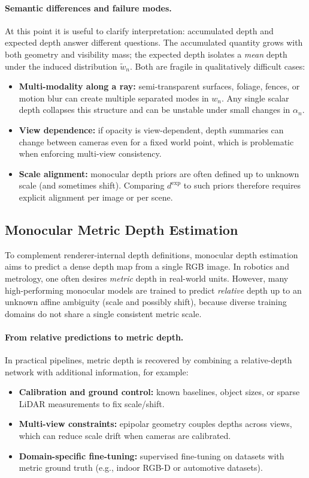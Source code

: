\documentclass{report}
\begin{document}
\paragraph{Semantic differences and failure modes.}
At this point it is useful to clarify interpretation: accumulated depth and expected depth answer different questions. The accumulated quantity grows with both geometry and visibility mass; the expected depth isolates a \emph{mean} depth under the induced distribution $\tilde{w}_n$. Both are fragile in qualitatively difficult cases:
\begin{itemize}
    \item \textbf{Multi-modality along a ray:} semi-transparent surfaces, foliage, fences, or motion blur can create multiple separated modes in $w_n$. Any single scalar depth collapses this structure and can be unstable under small changes in $\alpha_n$.
    \item \textbf{View dependence:} if opacity is view-dependent, depth summaries can change between cameras even for a fixed world point, which is problematic when enforcing multi-view consistency.
    \item \textbf{Scale alignment:} monocular depth priors are often defined up to unknown scale (and sometimes shift). Comparing $d^{\mathrm{exp}}$ to such priors therefore requires explicit alignment per image or per scene.
\end{itemize}

\subsection{Monocular Metric Depth Estimation}
To complement renderer-internal depth definitions, monocular depth estimation aims to predict a dense depth map from a single RGB image. In robotics and metrology, one often desires \emph{metric} depth in real-world units. However, many high-performing monocular models are trained to predict \emph{relative} depth up to an unknown affine ambiguity (scale and possibly shift), because diverse training domains do not share a single consistent metric scale.

\paragraph{From relative predictions to metric depth.}
In practical pipelines, metric depth is recovered by combining a relative-depth network with additional information, for example:
\begin{itemize}
    \item \textbf{Calibration and ground control:} known baselines, object sizes, or sparse LiDAR measurements to fix scale/shift.
    \item \textbf{Multi-view constraints:} epipolar geometry couples depths across views, which can reduce scale drift when cameras are calibrated.
    \item \textbf{Domain-specific fine-tuning:} supervised fine-tuning on datasets with metric ground truth (e.g., indoor RGB-D or automotive datasets).
\end{itemize}
\end{document}
